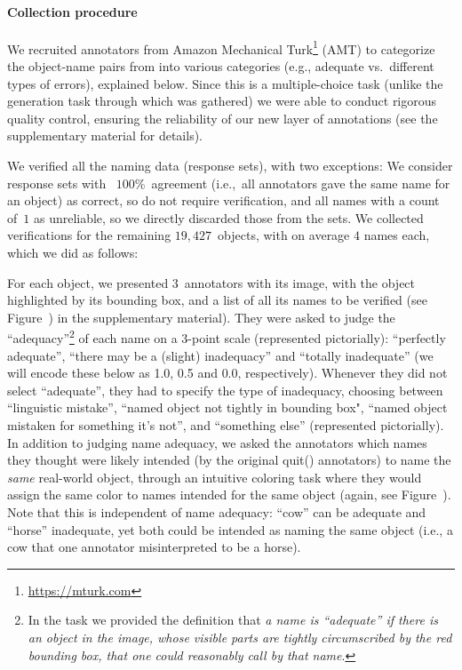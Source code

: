 
\paragraph{Collection procedure}
\label{sect:mn_verification}

We recruited annotators from Amazon Mechanical Turk\footnote{
	\url{https://mturk.com}
} (AMT) to categorize the object-name pairs from \mn into various categories (e.g., adequate vs.\ different types of errors), explained below.
Since this is a multiple-choice task (unlike the generation task through which \mn was gathered) we were able to conduct rigorous quality control, ensuring the reliability of our new layer of annotations (see the supplementary material for details).

We verified all the \mn naming data (response sets), with two exceptions: 
We consider response sets with ~$100$\%~agreement (i.e.,~all annotators gave the same name for an object) as correct, so do not require verification, and all names with a count of~$1$ as unreliable, so we directly discarded those from the sets.
We collected verifications for the remaining $19,427$~objects, with on average $4$ names each, which we did as follows:

For each object, we presented $3$~annotators with its image, with the object highlighted by its bounding box, and a list of all its names to be verified (see Figure~) in the supplementary material).
They were asked to judge the ``adequacy''\footnote{
	In the task we provided the definition that \textit{a name is ``adequate'' if there is an object in the image, whose visible parts are tightly circumscribed by the red bounding box, that one could reasonably call by that name}.
} of each name on a 3-point scale (represented pictorially): ``perfectly adequate'', ``there may be a (slight) inadequacy'' and ``totally inadequate'' (we will encode these below as 1.0, 0.5 and 0.0, respectively).
Whenever they did not select ``adequate'', they had to specify the type of inadequacy, choosing between ``linguistic mistake'', ``named object not tightly in bounding box",  ``named object mistaken for something it's not'', and ``something else'' (represented pictorially).
In addition to judging name adequacy, we asked the annotators which names they thought were likely intended (by the original    quit()
 \mn annotators) to name the \textit{same} real-world object, 
through an intuitive coloring task where they would assign the same color to names intended for the same object (again, see Figure~).
Note that this is independent of name adequacy: ``cow'' can be adequate and ``horse'' inadequate, yet both could be intended as naming the same object (i.e., a cow that one annotator misinterpreted to be a horse).

